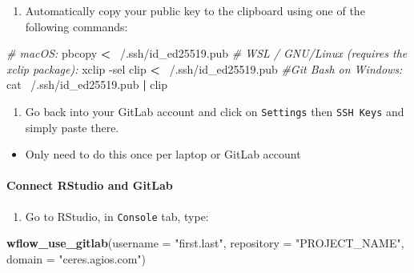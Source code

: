 \documentclass[openany]{article}
\newenvironment{Shaded}{\begin{snugshade}}{\end{snugshade}}
\newcommand{\CommentTok}[1]{\textcolor[rgb]{0.56,0.35,0.01}{\textit{#1}}}
\newcommand{\DataTypeTok}[1]{\textcolor[rgb]{0.13,0.29,0.53}{#1}}
\newcommand{\ExtensionTok}[1]{#1}
\newcommand{\FunctionTok}[1]{\textcolor[rgb]{0.00,0.00,0.00}{#1}}
\newcommand{\KeywordTok}[1]{\textcolor[rgb]{0.13,0.29,0.53}{\textbf{#1}}}
\newcommand{\NormalTok}[1]{#1}
\newcommand{\OperatorTok}[1]{\textcolor[rgb]{0.81,0.36,0.00}{\textbf{#1}}}
\newcommand{\StringTok}[1]{\textcolor[rgb]{0.31,0.60,0.02}{#1}}
\providecommand{\tightlist}{%
  \setlength{\itemsep}{0pt}\setlength{\parskip}{0pt}}
\let\oldparagraph\paragraph
\renewcommand{\paragraph}[1]{\oldparagraph{#1}\mbox{}}
\begin{document}
\begin{enumerate}
\def\labelenumi{\arabic{enumi}.}
\tightlist
\item
  Automatically copy your public key to the clipboard using one of the following commands:
\end{enumerate}

\begin{Shaded}
\begin{Highlighting}[]
\CommentTok{# macOS:}
\ExtensionTok{pbcopy} \OperatorTok{<}\NormalTok{ ~/.ssh/id_ed25519.pub}
\CommentTok{# WSL / GNU/Linux (requires the xclip package):}
\ExtensionTok{xclip}\NormalTok{ -sel clip }\OperatorTok{<}\NormalTok{ ~/.ssh/id_ed25519.pub}
\CommentTok{#Git Bash on Windows:}
\FunctionTok{cat}\NormalTok{ ~/.ssh/id_ed25519.pub }\KeywordTok{|} \ExtensionTok{clip}
\end{Highlighting}
\end{Shaded}

\begin{enumerate}
\def\labelenumi{\arabic{enumi}.}
\setcounter{enumi}{1}
\tightlist
\item
  Go back into your GitLab account and click on \texttt{Settings} then \texttt{SSH\ Keys} and simply paste there.
\end{enumerate}

\begin{itemize}
\tightlist
\item
  Only need to do this once per laptop or GitLab account
\end{itemize}

\hypertarget{connect-rstudio-and-gitlab}{%
\paragraph{Connect RStudio and GitLab}\label{connect-rstudio-and-gitlab}}

\begin{enumerate}
\def\labelenumi{\arabic{enumi}.}
\tightlist
\item
  Go to RStudio, in \texttt{Console} tab, type:
\end{enumerate}

\begin{Shaded}
\begin{Highlighting}[]
 \KeywordTok{wflow_use_gitlab}\NormalTok{(}\DataTypeTok{username =} \StringTok{"first.last"}\NormalTok{, }\DataTypeTok{repository =} \StringTok{"PROJECT_NAME"}\NormalTok{, }\DataTypeTok{domain =} \StringTok{"ceres.agios.com"}\NormalTok{)}
\end{Highlighting}
\end{Shaded}
\end{document}
